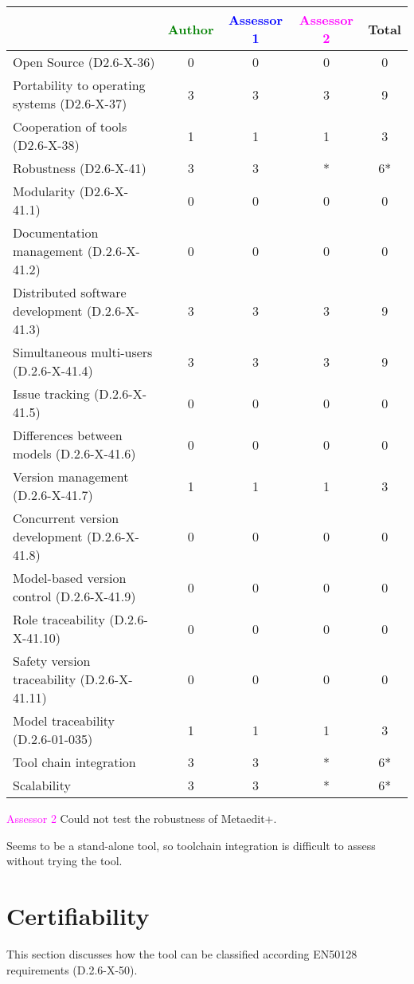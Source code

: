 \begin{tabular}{|l | c | c | c | c|}
\hline
& \textcolor{green}{Author} & \textcolor{blue}{Assessor 1} & \textcolor{magenta}{Assessor 2} & Total \\
\hline 
Open Source (D2.6-X-36) &0 &0 & 0& 0  \\
\hline 
Portability to operating systems (D2.6-X-37) &3 &3 & 3&  9 \\
\hline
Cooperation of tools (D2.6-X-38) &1 &1 & 1& 3 \\
\hline
Robustness (D2.6-X-41) &3 &3 & *& 6* \\
\hline
Modularity (D2.6-X-41.1) &0 &0 & 0& 0 \\
\hline
Documentation management (D.2.6-X-41.2) &0 &0 & 0& 0\\
\hline
Distributed software development (D.2.6-X-41.3)  &3 &3 & 3& 9\\
\hline
Simultaneous multi-users (D.2.6-X-41.4)   &3 &3 & 3& 9 \\
\hline
Issue tracking (D.2.6-X-41.5) &0 &0 & 0& 0 \\
\hline
Differences between models (D.2.6-X-41.6) &0 &0 & 0& 0 \\
\hline
Version management (D.2.6-X-41.7) &1 &1 & 1& 3 \\
\hline
Concurrent version development (D.2.6-X-41.8) &0 &0 & 0& 0 \\
\hline
Model-based version control (D.2.6-X-41.9) &0 &0 & 0& 0 \\
\hline
Role traceability (D.2.6-X-41.10) &0 &0 & 0& 0 \\
\hline
Safety version traceability (D.2.6-X-41.11) &0 &0 & 0& 0 \\
\hline
Model traceability (D.2.6-01-035) &1 &1 & 1& 3 \\
\hline
Tool chain integration &3 &3 & *& 6* \\
\hline
Scalability &3 &3 & * & 6*\\
\hline
\end{tabular}

\textcolor{magenta}{Assessor 2} Could not test the robustness of Metaedit+.

Seems to be a stand-alone tool, so toolchain integration is difficult to assess
without trying the tool.

\section{Certifiability}

This section discusses how the tool can be classified according EN50128 requirements (D.2.6-X-50).


